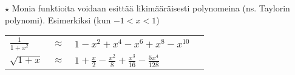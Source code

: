 \begin{tehtavasivu}
%

\begin{tehtava} $\star$
	Monia funktioita voidaan esittää likimääräisesti polynomeina (ns. Taylorin polynomi). Esimerkiksi (kun $-1<x<1$)

	\begin{tabular}{lcll}
	$\frac{1}{1+x^2}$ &$\approx$ & $1-x^2+x^4-x^6+x^8-x^{10}$ \\
	$\sqrt{1+x}$ & $\approx $ & $ 1+\frac{x}{2}
	-\frac{x^2}{8}+\frac{x^3}{16}-\frac{5x^4}{128}$
	\end{tabular}


\end{tehtava}
\end{tehtavasivu}
